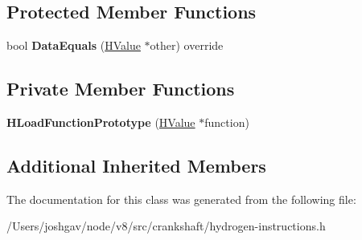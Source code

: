 \subsection*{Protected Member Functions}
\begin{DoxyCompactItemize}
\item 
bool {\bfseries Data\+Equals} (\hyperlink{classv8_1_1internal_1_1_h_value}{H\+Value} $\ast$other) override\hypertarget{classv8_1_1internal_1_1_h_load_function_prototype_a81af4d49e941e73d1372f26f1bc05d2b}{}\label{classv8_1_1internal_1_1_h_load_function_prototype_a81af4d49e941e73d1372f26f1bc05d2b}

\end{DoxyCompactItemize}
\subsection*{Private Member Functions}
\begin{DoxyCompactItemize}
\item 
{\bfseries H\+Load\+Function\+Prototype} (\hyperlink{classv8_1_1internal_1_1_h_value}{H\+Value} $\ast$function)\hypertarget{classv8_1_1internal_1_1_h_load_function_prototype_a92ddec21b7fb870975aa7580b5855001}{}\label{classv8_1_1internal_1_1_h_load_function_prototype_a92ddec21b7fb870975aa7580b5855001}

\end{DoxyCompactItemize}
\subsection*{Additional Inherited Members}


The documentation for this class was generated from the following file\+:\begin{DoxyCompactItemize}
\item 
/\+Users/joshgav/node/v8/src/crankshaft/hydrogen-\/instructions.\+h\end{DoxyCompactItemize}
